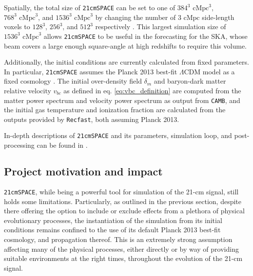 \documentclass[floats,floatfix,showpacs,amssymb,prd,superscriptaddress,nofootinbib]{revtex4-2} %
\newcommand{\code}{\texttt}
\begin{document}
Spatially, the total size of \code{21cmSPACE} can be set to one of $384^3 \text{ cMpc}^3$, $768^3 \text{ cMpc}^3$, and $1536^3 \text{ cMpc}^3$ by changing the number of $3 \text{ cMpc}$ side-length voxels to $128^3$, $256^3$, and $512^3$ respectively \citep{dhandha_2022}. This largest simulation size of $1536^3 \text{ cMpc}^3$ allows \code{21cmSPACE} to be useful in the forecasting for the SKA, whose beam covers a large enough square-angle at high redshifts to require this volume. 

Additionally, the initial conditions are currently calculated from fixed parameters. In particular, \code{21cmSPACE} assumes the Planck 2013 best-fit $\Lambda$CDM model as a fixed cosmology \citep{Planck2013results}. The initial over-density field $\delta_m$ and baryon-dark matter relative velocity $v_{bc}$ as defined in eq. \ref{eq:vbc_definition} are computed \citep{Fialkov_2012} from the matter power spectrum and velocity power spectrum as output from \code{CAMB}, and the initial gas temperature and ionization fraction are calculated from the outputs provided by \code{Recfast}, both assuming Planck 2013.

In-depth descriptions of \code{21cmSPACE} and its parameters, simulation loop, and post-processing can be found in \citet{Gessey-Jones_2023, Gessey-Jones_2024, gessey-jones_thesis}.

\subsection{Project motivation and impact}

\code{21cmSPACE}, while being a powerful tool for simulation of the 21-cm signal, still holds some limitations. Particularly, as outlined in the previous section, despite there offering the option to include or exclude effects from a plethora of physical evolutionary processes, the instantiation of the simulation from its initial conditions remains confined to the use of its default Planck 2013 best-fit cosmology, and propagation thereof. This is an extremely strong assumption affecting many of the physical processes, either directly or by way of providing suitable environments at the right times, throughout the evolution of the 21-cm signal.
\end{document}
